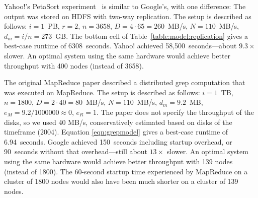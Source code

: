 
Yahoo!'s PetaSort experiment~\cite{hadoop2009} is similar to Google's,
with one
difference: The output was stored on HDFS with two-way replication.
The setup is described as follows: $i = 1$~PB, $r = 2$, $n = 3658$, $D = 4 \cdot 65 = 260$~MB/s,
$N = 110$~MB/s, $d_m = i/n = 273$~GB.
The bottom cell of Table~\ref{table:model:replication} gives
a best-case runtime of 6308~seconds.
Yahoo! achieved
58,500~seconds---about $9.3\times$
slower.
An optimal system using the same hardware would achieve better
throughput with 400 nodes (instead of 3658).

The original MapReduce paper \cite{mapreduce} described a distributed grep
computation that was executed on MapReduce. The setup is described
as follows: $i = 1$~TB, $n = 1800$, $D = 2 \cdot 40 = 80$~MB/s,
$N = 110$~MB/s, $d_m = 9.2$~MB, $e_M = 9.2/1000000 \approx 0$, $e_R = 1$.
The paper does not specify the throughput of the disks, so we used 40 MB/s,
conservatively estimated based on disks of the timeframe (2004).
Equation \ref{eqn:grepmodel} gives a best-case runtime of 6.94~seconds.
Google achieved
150~seconds including startup overhead,
or 90~seconds without that overhead---still about $13\times$ slower.
An optimal system using the same hardware would achieve better
throughput with 139 nodes (instead of 1800).
The 60-second startup time experienced by MapReduce on a
cluster of 1800 nodes would also have been much shorter on a
cluster of 139 nodes.




